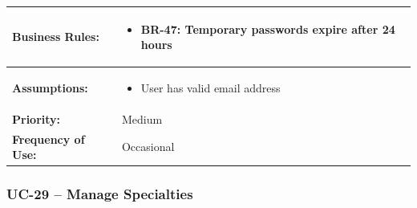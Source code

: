 \documentclass[12pt,a4paper]{article}
\begin{document}
\begin{longtable}{|p{4.5cm}|p{10.5cm}|}
\hline
\textbf{Business Rules:} &
\begin{itemize}
  \item BR-47: Temporary passwords expire after 24 hours
\end{itemize} \\
\hline
\textbf{Assumptions:} &
\begin{itemize}
  \item User has valid email address
\end{itemize} \\
\hline
\textbf{Priority:} & Medium \\
\hline
\textbf{Frequency of Use:} & Occasional \\
\hline
\end{longtable}

\subsubsection{UC-29 – Manage Specialties}
\end{document}
